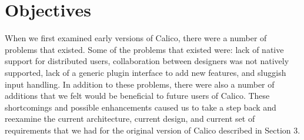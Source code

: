 \chapter{Objectives}

When we first examined early versions of Calico, there were a number of problems that existed. 
Some of the problems that existed were: lack of native support for distributed users,
collaboration between designers was not natively supported,
lack of a generic plugin interface to add new features, 
and sluggish input handling. 
In addition to these problems, there were also a number of additions that we felt would be beneficial to future users of Calico.
These shortcomings and possible enhancements caused us to take a step back and reexamine the current architecture, current design, and current set of requirements that we had for the original version of Calico described in Section 3.


